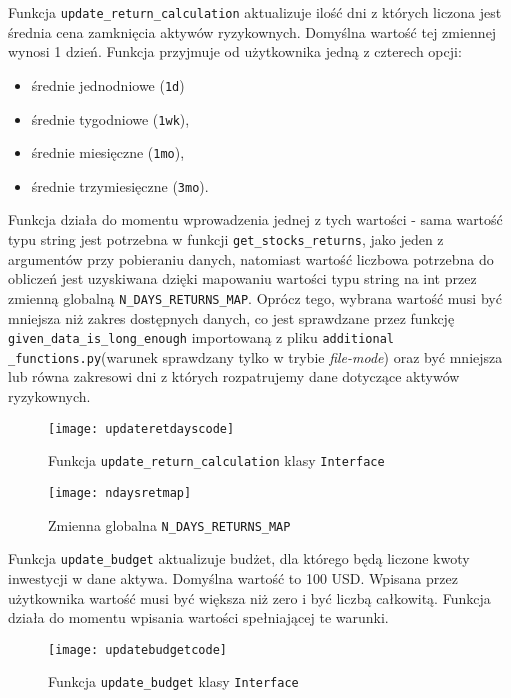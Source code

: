 \documentclass[magister]{dyplom}
\def\code#1{\texttt{#1}}
\begin{document}
Funkcja \code{update\_return\_calculation} aktualizuje ilość dni z których liczona jest średnia cena zamknięcia aktywów ryzykownych. Domyślna wartość tej zmiennej wynosi 1 dzień. Funkcja przyjmuje od użytkownika jedną z czterech opcji:
\begin{itemize}
	\item średnie jednodniowe (\code{1d})
	\item średnie tygodniowe (\code{1wk}),
	\item średnie miesięczne (\code{1mo}),
	\item średnie trzymiesięczne (\code{3mo}).
\end{itemize}
Funkcja działa do momentu wprowadzenia jednej z tych wartości - sama wartość typu string jest potrzebna w funkcji \code{get\_stocks\_returns}, jako jeden z argumentów przy pobieraniu danych, natomiast wartość liczbowa potrzebna do obliczeń jest uzyskiwana dzięki mapowaniu wartości typu string na int przez zmienną globalną \code{N\_DAYS\_RETURNS\_MAP}.
Oprócz tego, wybrana wartość musi być mniejsza niż zakres dostępnych danych, co jest sprawdzane przez funkcję \code{given\_data\_is\_long\_enough} importowaną z pliku \code{additional} \code{\_functions.py}(warunek sprawdzany tylko w trybie \textit{file-mode}) oraz być mniejsza lub równa zakresowi dni z których rozpatrujemy dane dotyczące aktywów ryzykownych.
\begin{figure}[ht]
	\centering
	\texttt{[image: updateretdayscode]}
	\caption{Funkcja \code{update\_return\_calculation} klasy \code{Interface}}
\end{figure}

\begin{figure}[ht]
	\centering
	\texttt{[image: ndaysretmap]}
	\caption{Zmienna globalna \code{N\_DAYS\_RETURNS\_MAP}}
\end{figure}
\newpage
Funkcja \code{update\_budget} aktualizuje budżet, dla którego będą liczone kwoty inwestycji w dane aktywa. Domyślna wartość to 100 USD. Wpisana przez użytkownika wartość musi być większa niż zero i być liczbą całkowitą. Funkcja działa do momentu wpisania wartości spełniającej te warunki.
\begin{figure}[ht]
	\centering
	\texttt{[image: updatebudgetcode]}
	\caption{Funkcja \code{update\_budget} klasy \code{Interface}}
\end{figure}
\end{document}
